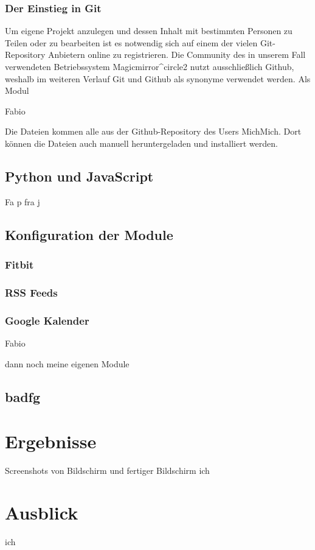 \documentclass[12pt,a4paper]{report}
\begin{document}
\subsection*{Der Einstieg in Git}
Um eigene Projekt anzulegen und dessen Inhalt mit bestimmten Personen zu Teilen oder zu bearbeiten ist es notwendig sich auf einem der vielen Git-Repository Anbietern online zu registrieren. Die Community des in unserem Fall verwendeten Betriebssystem Magicmirror^circle{2} nutzt ausschließlich Github, weshalb im weiteren Verlauf Git und Github als synonyme verwendet werden. 
Als Modul

Fabio


Die Dateien kommen alle aus der Github-Repository des Users MichMich. Dort können die Dateien auch manuell heruntergeladen und installiert werden. 
\section{Python und JavaScript}
Fa p fra j
\section{Konfiguration der Module}
\subsection{Fitbit}
\subsection{RSS Feeds}
\subsection{Google Kalender}
Fabio

dann noch meine eigenen Module
\section{badfg}






\chapter{Ergebnisse}
Screenshots von Bildschirm und fertiger Bildschirm
ich
\chapter{Ausblick}
ich
\end{document}
